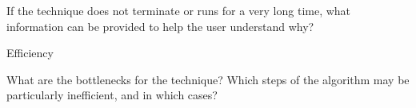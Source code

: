 \documentclass[a4paper]{article}
\begin{document}
\begin{minipage}[t]{0.16\linewidth}
\begin{betterlist}
\begin{betterlist}
			\item If the technique does not terminate or runs for a very long time, what information can be provided to help the user understand why?

		\end{betterlist}
		\item \alert{Efficiency}
		\begin{betterlist}
			\item What are the bottlenecks for the technique? Which steps of the algorithm may be particularly inefficient, and in which cases?


\end{betterlist}
\end{betterlist}
\end{minipage}
\end{document}
